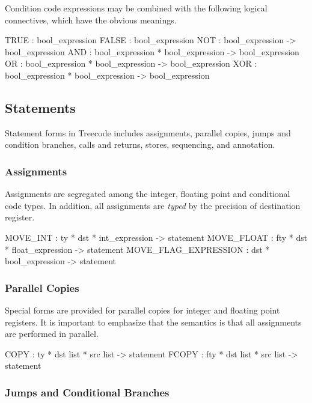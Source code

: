 Condition code expressions may be combined with the following
logical connectives, which have the obvious meanings.
\begin{SML}
   TRUE  : bool_expression 
   FALSE : bool_expression 
   NOT   : bool_expression -> bool_expression 
   AND   : bool_expression * bool_expression -> bool_expression 
   OR    : bool_expression * bool_expression -> bool_expression 
   XOR   : bool_expression * bool_expression -> bool_expression 
\end{SML}

\subsection{Statements}

Statement forms in Treecode includes assignments, parallel copies,
jumps and condition branches, calls and returns, stores, sequencing,
and annotation.

\subsubsection{Assignments}

Assignments are segregated among the integer, floating point and
conditional code types.  In addition, all assignments are \emph{typed}
by the precision of destination register.

\begin{SML}
   MOVE_INT   : ty * dst * int_expression -> statement
   MOVE_FLOAT  : fty * dst * float_expression -> statement
   MOVE_FLAG_EXPRESSION : dst * bool_expression -> statement
\end{SML}  

\subsubsection{Parallel Copies}

Special forms are provided for parallel copies for integer and
floating point registers.  It is important to emphasize that
the semantics is that all assignments are performed in parallel.

\begin{SML}
   COPY  : ty * dst list * src list -> statement
   FCOPY : fty * dst list * src list -> statement
\end{SML}

\subsubsection{Jumps and Conditional Branches}  

